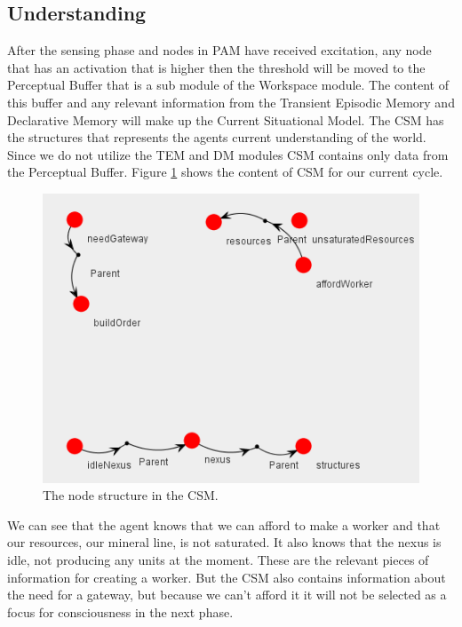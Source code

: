 \subsection{Understanding}
After the sensing phase and nodes in PAM have received excitation, any node that has an activation that is higher then the threshold will be moved to the Perceptual Buffer that is a sub module of the Workspace module. The content of this buffer and any relevant information from the Transient Episodic Memory and Declarative Memory will make up the Current Situational Model. The CSM has the structures that represents the agents current understanding of the world. Since we do not utilize the TEM and DM modules CSM contains only data from the Perceptual Buffer. Figure \ref{fig:csm} shows the content of CSM for our current cycle.

\begin{figure}[h!tb]
\centering
\includegraphics[scale=1.0]{graphics/perceptual_buffer.png}
\caption{The node structure in the CSM.}
\label{fig:csm}
\end{figure}

We can see that the agent knows that we can afford to make a worker and that our resources, our mineral line, is not saturated. It also knows that the nexus is idle, not producing any units at the moment. These are the relevant pieces of information for creating a worker. But the CSM also contains information about the need for a gateway, but because we can't afford it it will not be selected as a focus for consciousness in the next phase.


